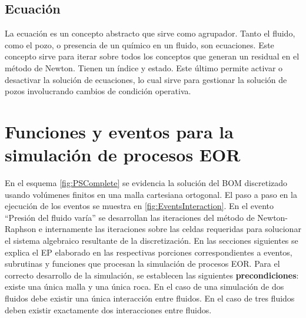
\subsection{Ecuación}\label{subsec:PS_Equation}
La ecuación es un concepto abstracto que sirve como agrupador. Tanto el fluido, como el pozo, o presencia de un químico en un fluido, son ecuaciones. Este concepto sirve para iterar sobre todos los conceptos que generan un residual en el método de Newton. Tienen un índice y estado. Este último permite activar o desactivar la solución de ecuaciones, lo cual sirve para gestionar la solución de pozos involucrando cambios de condición operativa.


\section{Funciones y eventos para la simulación de procesos EOR}\label{subsec:PS_EOR}
En el esquema \ref{fig:PSComplete} se evidencia la solución del BOM discretizado usando volúmenes finitos en una malla cartesiana ortogonal. El paso a paso en la ejecución de los eventos se muestra en \ref{fig:EventsInteraction}.  En el evento ``Presión del fluido varía'' se desarrollan las iteraciones del método de Newton-Raphson e internamente las iteraciones sobre las celdas requeridas para solucionar el sistema algebraico resultante de la discretización. En las secciones siguientes se explica el EP elaborado en las respectivas porciones correspondientes a eventos, subrutinas y funciones que procesan la simulación de procesos EOR. Para el correcto desarrollo de la simulación, se establecen las siguientes \textbf{precondiciones}: existe una única malla y una única roca. En el caso de una simulación de dos fluidos debe existir una única interacción entre fluidos. En el caso de tres fluidos deben existir exactamente dos interacciones entre fluidos.



